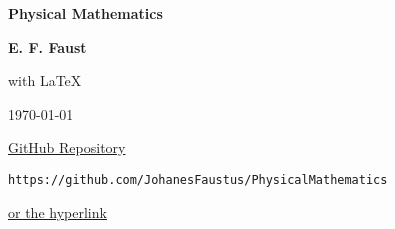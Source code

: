 \documentclass[../../main.tex]{subfiles}
\begin{document}
\begin{center}

    \Huge
    \textbf{Physical Mathematics}

    \vspace{1.5cm}
    \Large
    \textbf{E. F. Faust}

    \vspace{0.2cm}
    \large with \LaTeX
    \vspace{\fill}
    \vspace{\fill}

    \Large
    {\today}

\end{center}

\clearpage

\vspace*{\fill}                      
\begin{center}

    \vspace{0.5cm}
    \Large\href{https://github.com/JohanesFaustus/PhysicalMathematics}{GitHub Repository}

    \vspace{0.2cm}

    \normalsize
    \texttt{https://github.com/JohanesFaustus/PhysicalMathematics}

    \href{https://github.com/JohanesFaustus/PhysicalMathematics}{or the hyperlink}
\end{center}
\vspace*{\fill}
\end{document}
